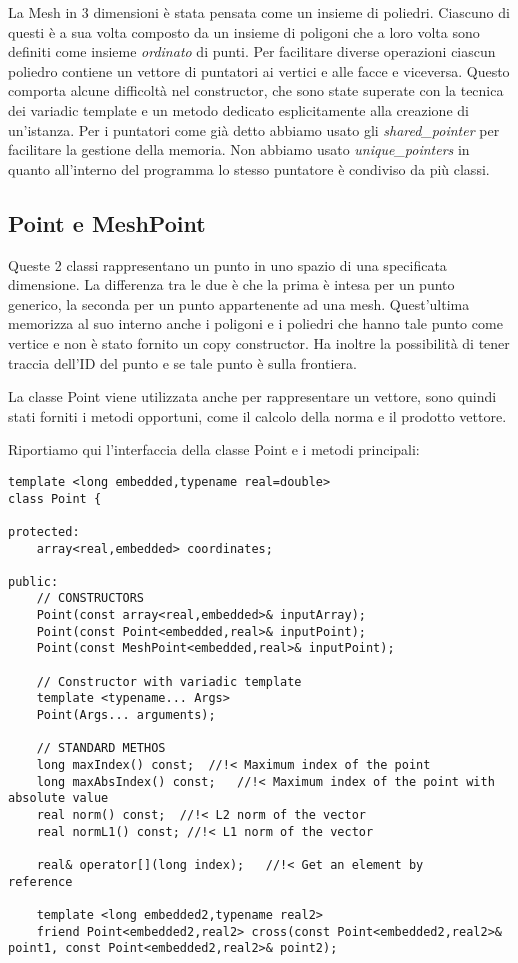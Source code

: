\documentclass[oneside,12pt]{book}  %
\theoremstyle{plain}
\theoremstyle{definition}
\theoremstyle{remark}
\numberwithin{equation}{chapter} %
\begin{document}
La Mesh in 3 dimensioni \`e stata pensata come un insieme di
poliedri. Ciascuno di questi \`e a sua volta composto da un insieme di
poligoni che a loro volta sono definiti come insieme \textit{ordinato}
di punti. Per facilitare diverse operazioni ciascun poliedro contiene
un vettore di puntatori ai vertici e alle facce e viceversa. Questo
comporta alcune difficolt\`a nel constructor, che sono state superate
con la tecnica dei variadic template e un metodo dedicato
esplicitamente alla creazione di un'istanza. Per i puntatori come
gi\`a detto abbiamo usato gli \textit{shared\_pointer} per facilitare
la gestione della memoria. Non abbiamo usato \textit{unique\_pointers}
in quanto all'interno del programma lo stesso puntatore \`e condiviso
da pi\`u classi.

\subsection{Point e MeshPoint}
Queste 2 classi rappresentano un punto in uno spazio di una
specificata dimensione. La differenza tra le due \`e che la prima \`e
intesa per un punto generico, la seconda per un punto appartenente ad
una mesh. Quest'ultima memorizza al suo interno anche i poligoni e i
poliedri che hanno tale punto come vertice e non \`e stato fornito un
copy constructor. Ha inoltre la possibilit\`a di tener traccia dell'ID
del punto e se tale punto \`e sulla frontiera.

La classe Point viene utilizzata anche per rappresentare un vettore,
sono quindi stati forniti i metodi opportuni, come il calcolo della
norma e il prodotto vettore.

Riportiamo qui l'interfaccia della classe Point e i metodi principali:

\begin{verbatim}
template <long embedded,typename real=double>
class Point {

protected:
    array<real,embedded> coordinates;

public:
    // CONSTRUCTORS
    Point(const array<real,embedded>& inputArray);
    Point(const Point<embedded,real>& inputPoint);
    Point(const MeshPoint<embedded,real>& inputPoint);

    // Constructor with variadic template
    template <typename... Args>
    Point(Args... arguments);

    // STANDARD METHOS
    long maxIndex() const;	//!< Maximum index of the point
    long maxAbsIndex() const;	//!< Maximum index of the point with absolute value
    real norm() const;  //!< L2 norm of the vector
    real normL1() const; //!< L1 norm of the vector

    real& operator[](long index);	//!< Get an element by
reference

    template <long embedded2,typename real2>
    friend Point<embedded2,real2> cross(const Point<embedded2,real2>&
point1, const Point<embedded2,real2>& point2);
\end{verbatim}
\end{document}
